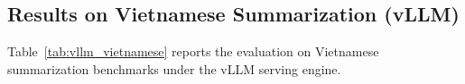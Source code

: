\documentclass[11pt]{article}
\begin{document}
\subsection{Results on Vietnamese Summarization (vLLM)}

Table~\ref{tab:vllm_vietnamese} reports the evaluation on Vietnamese summarization benchmarks under the vLLM serving engine.

\begin{table}[t]
\centering
\small
\caption{Average acceptance length $\tau$, decoding speed (tokens/s), and speedups across different models and settings on VietNamese summarization datasets. (\textbf{VLLM})}
\label{tab:vllm_vietnamese}
{\setlength{\tabcolsep}{2.2pt}\renewcommand{\arraystretch}{1.2}}
\end{table}
\end{document}
